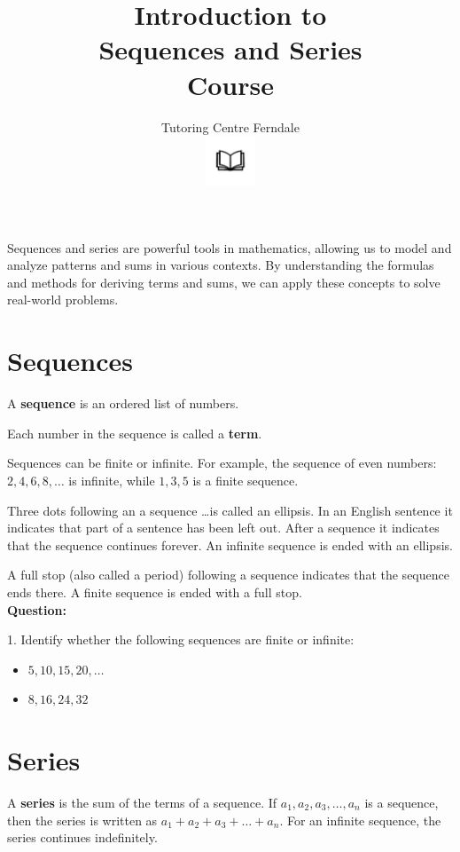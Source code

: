 \documentclass[12pt]{article}
\title{Introduction to\\Sequences and Series\\Course\\}
\author{Tutoring Centre Ferndale\\
\includegraphics[width=4em]{ApS_logo.png}}
\date{}
\begin{document}
\maketitle

Sequences and series are powerful tools in mathematics, allowing us to model and analyze patterns and sums in various contexts. By understanding the formulas and methods for deriving terms and sums, we can apply these concepts to solve real-world problems.

\section*{Sequences}

A \textbf{sequence} is an ordered list of numbers.

Each number in the sequence is called a \textbf{term}.

Sequences can be finite or infinite. For example, the sequence of even numbers: \(2, 4, 6, 8, \ldots\) is infinite, while \(1, 3, 5\) is a finite sequence.

Three dots following an a sequence \ldots is called an ellipsis. In an English sentence it indicates that part of a sentence has been left out. After a sequence it indicates that the sequence continues forever. An infinite sequence is ended with an ellipsis.

A full stop (also called a period) following a sequence indicates that the sequence ends there. A finite sequence is ended with a full stop.\\

\textbf{Question:}

1. Identify whether the following sequences are finite or infinite:
   \begin{itemize}
       \item \(5, 10, 15, 20, \ldots\)
       \item \(8, 16, 24, 32\)
   \end{itemize}

\newpage

\section*{Series}

A \textbf{series} is the sum of the terms of a sequence. If \(a_1, a_2, a_3, \ldots, a_n\) is a sequence, then the series is written as \(a_1 + a_2 + a_3 + \ldots + a_n\). For an infinite sequence, the series continues indefinitely.\\
\end{document}
